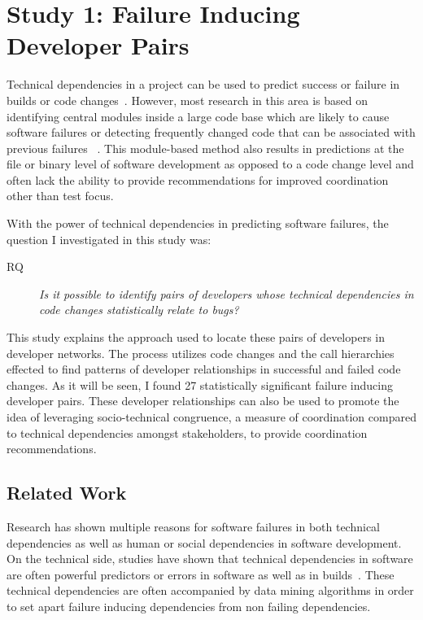 \section{Study 1: Failure Inducing Developer Pairs}
\label{study:pairs}

Technical dependencies in a project can be used to predict success or failure in
builds or code changes~\cite{Pinzger:2008:DNP, Zimmermann:2008:PDU}. However, most 
research in this area is based on identifying
central modules inside a large code base which are likely to cause software failures or
detecting frequently changed code that can be associated with previous failures
~\cite{Kim:2006:AIB}. 
This module-based method also results in predictions 
at the file or binary level of software development as opposed to a code change level
and often lack the ability to provide recommendations for improved coordination
other than test focus.

With the power of technical dependencies in predicting software failures, the question I
investigated in this study was:

\begin{description}
        \item[RQ] \textit{Is it possible to identify pairs 
        of developers whose technical dependencies in code changes statistically relate to bugs?}
\end{description}

This study explains the approach used to locate these pairs of developers in developer networks.
The process utilizes code changes and the call hierarchies effected to find patterns of developer 
relationships in successful and failed code changes. As it will be seen, I found 27 statistically
significant failure inducing developer pairs. These developer relationships can also be used
to promote the idea of leveraging socio-technical congruence, a measure of coordination compared
to technical dependencies amongst stakeholders, to provide coordination recommendations.

\subsection{Related Work}

Research has shown multiple reasons for software failures in both technical dependencies as well
as human or social dependencies in software development. On the technical side, studies have shown that
technical dependencies in software are often powerful predictors or errors in software as well as
in builds~\cite{Pinzger:2008:DNP, Zimmermann:2008:PDU, Hassan:4019574}. These technical dependencies
are often accompanied by data mining algorithms in order to set apart failure inducing dependencies
from non failing dependencies.

